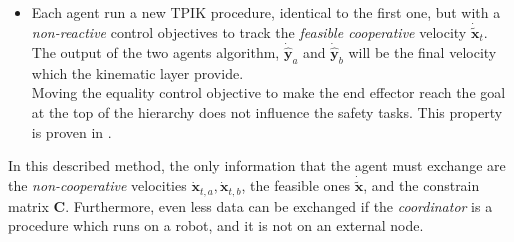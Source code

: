 \begin{itemize}
	\item Each agent run a new TPIK procedure, identical to the first one, but with a \textit{non-reactive} control objectives to track the \textit{feasible cooperative} velocity $\dot{\tilde{\boldsymbol{x}}}_t$. The output of the two agents algorithm, $\boldsymbol{\dot{\hat{y}}}_a$ and $\boldsymbol{\dot{\hat{y}}}_b$ will be the final velocity which the kinematic layer provide.\\
	Moving the equality control objective to make the end effector reach the goal at the top of the hierarchy does not influence the safety tasks. This property is proven in \cite{tesiWander}.
\end{itemize}

In this described method, the only information that the agent must exchange are the
\textit{non-cooperative} velocities $\boldsymbol{\dot{x}}_{t,a}, \boldsymbol{\dot{x}}_{t,b}$, the feasible ones $\boldsymbol{\dot{\tilde{x}}}$, and the constrain matrix $\boldsymbol{C}$. Furthermore, even less data can be exchanged if the \textit{coordinator} is a procedure which runs on a robot, and it is not on an external node. 

